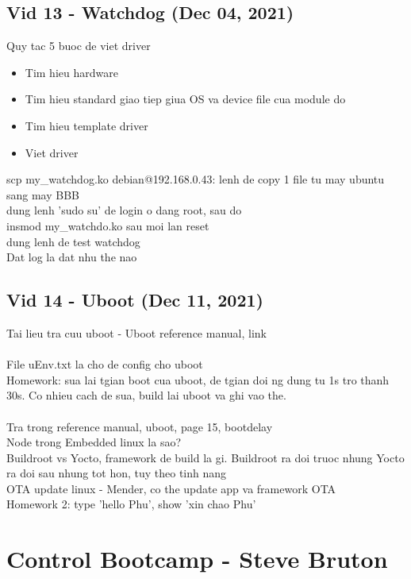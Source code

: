 \documentclass{article}
\begin{document}
\subsection{Vid 13 - Watchdog (Dec 04, 2021)}
Quy tac 5 buoc de viet driver
\begin{itemize}
  \item Tim hieu hardware 
  \item Tim hieu standard giao tiep giua OS va device file cua module do
  \item Tim hieu template driver
  \item Viet driver
\end{itemize}
scp my\_watchdog.ko debian@192.168.0.43: lenh de copy 1 file tu may ubuntu sang may BBB
\\dung lenh 'sudo su' de login o dang root, sau do
\\insmod my\_watchdo.ko sau moi lan reset
\\dung lenh  de test watchdog
\\Dat log la dat nhu the nao

\subsection{Vid 14 - Uboot (Dec 11, 2021)}
Tai lieu tra cuu uboot - Uboot reference manual,
link \\
\\File uEnv.txt la cho de config cho uboot
\\Homework: sua lai tgian boot cua uboot, de tgian doi ng dung tu 1s tro thanh 30s. 
Co nhieu cach de sua, build lai uboot va ghi vao the.\\
\\Tra trong reference manual, uboot, page 15, bootdelay
\\Node trong Embedded linux la sao?
\\Buildroot vs Yocto, framework de build la gi. 
Buildroot ra doi truoc nhung Yocto ra doi sau nhung tot hon, tuy theo tinh nang
\\OTA update linux - Mender, co the update app va framework OTA
\\Homework 2: type 'hello Phu', show 'xin chao Phu'

\section{Control Bootcamp - Steve Bruton}
\end{document}
